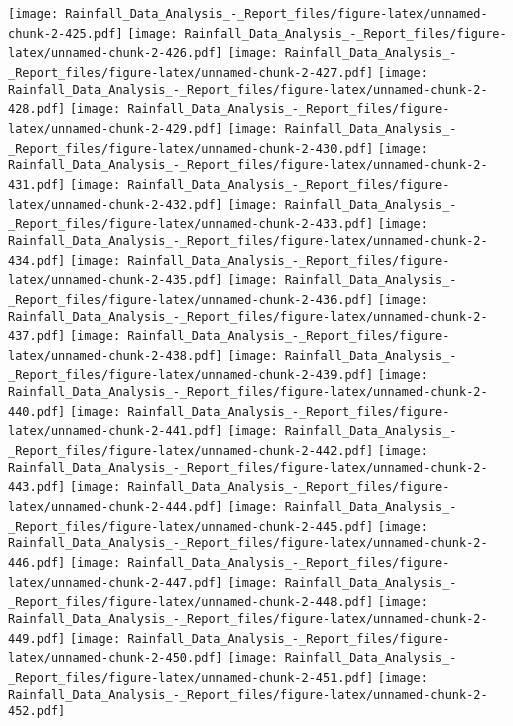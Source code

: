 \documentclass[
]{article}
\begin{document}
\texttt{[image: Rainfall\_Data\_Analysis\_-\_Report\_files/figure-latex/unnamed-chunk-2-425.pdf]}
\texttt{[image: Rainfall\_Data\_Analysis\_-\_Report\_files/figure-latex/unnamed-chunk-2-426.pdf]}
\texttt{[image: Rainfall\_Data\_Analysis\_-\_Report\_files/figure-latex/unnamed-chunk-2-427.pdf]}
\texttt{[image: Rainfall\_Data\_Analysis\_-\_Report\_files/figure-latex/unnamed-chunk-2-428.pdf]}
\texttt{[image: Rainfall\_Data\_Analysis\_-\_Report\_files/figure-latex/unnamed-chunk-2-429.pdf]}
\texttt{[image: Rainfall\_Data\_Analysis\_-\_Report\_files/figure-latex/unnamed-chunk-2-430.pdf]}
\texttt{[image: Rainfall\_Data\_Analysis\_-\_Report\_files/figure-latex/unnamed-chunk-2-431.pdf]}
\texttt{[image: Rainfall\_Data\_Analysis\_-\_Report\_files/figure-latex/unnamed-chunk-2-432.pdf]}
\texttt{[image: Rainfall\_Data\_Analysis\_-\_Report\_files/figure-latex/unnamed-chunk-2-433.pdf]}
\texttt{[image: Rainfall\_Data\_Analysis\_-\_Report\_files/figure-latex/unnamed-chunk-2-434.pdf]}
\texttt{[image: Rainfall\_Data\_Analysis\_-\_Report\_files/figure-latex/unnamed-chunk-2-435.pdf]}
\texttt{[image: Rainfall\_Data\_Analysis\_-\_Report\_files/figure-latex/unnamed-chunk-2-436.pdf]}
\texttt{[image: Rainfall\_Data\_Analysis\_-\_Report\_files/figure-latex/unnamed-chunk-2-437.pdf]}
\texttt{[image: Rainfall\_Data\_Analysis\_-\_Report\_files/figure-latex/unnamed-chunk-2-438.pdf]}
\texttt{[image: Rainfall\_Data\_Analysis\_-\_Report\_files/figure-latex/unnamed-chunk-2-439.pdf]}
\texttt{[image: Rainfall\_Data\_Analysis\_-\_Report\_files/figure-latex/unnamed-chunk-2-440.pdf]}
\texttt{[image: Rainfall\_Data\_Analysis\_-\_Report\_files/figure-latex/unnamed-chunk-2-441.pdf]}
\texttt{[image: Rainfall\_Data\_Analysis\_-\_Report\_files/figure-latex/unnamed-chunk-2-442.pdf]}
\texttt{[image: Rainfall\_Data\_Analysis\_-\_Report\_files/figure-latex/unnamed-chunk-2-443.pdf]}
\texttt{[image: Rainfall\_Data\_Analysis\_-\_Report\_files/figure-latex/unnamed-chunk-2-444.pdf]}
\texttt{[image: Rainfall\_Data\_Analysis\_-\_Report\_files/figure-latex/unnamed-chunk-2-445.pdf]}
\texttt{[image: Rainfall\_Data\_Analysis\_-\_Report\_files/figure-latex/unnamed-chunk-2-446.pdf]}
\texttt{[image: Rainfall\_Data\_Analysis\_-\_Report\_files/figure-latex/unnamed-chunk-2-447.pdf]}
\texttt{[image: Rainfall\_Data\_Analysis\_-\_Report\_files/figure-latex/unnamed-chunk-2-448.pdf]}
\texttt{[image: Rainfall\_Data\_Analysis\_-\_Report\_files/figure-latex/unnamed-chunk-2-449.pdf]}
\texttt{[image: Rainfall\_Data\_Analysis\_-\_Report\_files/figure-latex/unnamed-chunk-2-450.pdf]}
\texttt{[image: Rainfall\_Data\_Analysis\_-\_Report\_files/figure-latex/unnamed-chunk-2-451.pdf]}
\texttt{[image: Rainfall\_Data\_Analysis\_-\_Report\_files/figure-latex/unnamed-chunk-2-452.pdf]}
\end{document}
